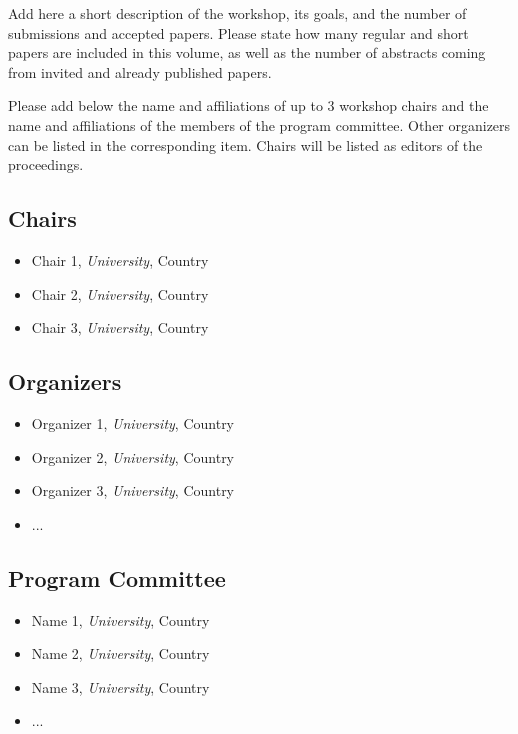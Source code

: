 \documentclass[
]{ceurart}
\begin{document}
Add here a short description of the workshop, its goals, and the number of submissions and accepted papers. Please state how many regular and short papers are included in this volume, as well as the number of abstracts coming from invited and already published papers.

Please add below the name and affiliations of up to 3 workshop chairs and the name and affiliations of the members of the program committee. Other organizers can be listed in the corresponding item.
%
Chairs will be listed as editors of the proceedings.

\subsection*{Chairs}
\begin{itemize}
  \item Chair 1, \emph{University}, Country
  \item Chair 2, \emph{University}, Country
  \item Chair 3, \emph{University}, Country
\end{itemize}

\subsection*{Organizers}
\begin{itemize}
  \item Organizer 1, \emph{University}, Country
  \item Organizer 2, \emph{University}, Country
  \item Organizer 3, \emph{University}, Country
  \item ...
\end{itemize}

\subsection*{Program Committee}
\begin{itemize}
  \item Name 1, \emph{University}, Country
  \item Name 2, \emph{University}, Country
  \item Name 3, \emph{University}, Country
  \item ...
\end{itemize}
\end{document}
